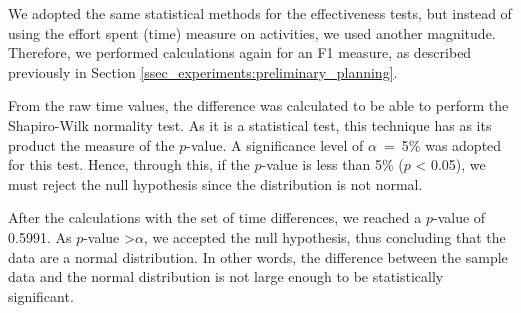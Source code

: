 We adopted the same statistical methods for the effectiveness tests, but instead of using the effort spent (time) measure on activities, we used another magnitude.
Therefore, we performed calculations again for an F1 measure, as described previously in Section \ref{ssec_experiments:preliminary_planning}.


From the raw time values, the difference was calculated to be able to perform the Shapiro-Wilk normality test.
As it is a statistical test, this technique has as its product the measure of the $p$-value.
A significance level of $\alpha$~=~5\% was adopted for this test.
Hence, through this, if the $p$-value is less than 5\% ($p$ < 0.05), we must reject the null hypothesis since the distribution is not normal.

After the calculations with the set of time differences, we reached a $p$-value of 0.5991.
As $p$-value \textgreater $\alpha$, we accepted the null hypothesis, thus concluding that the data are a normal distribution.
In other words, the difference between the sample data and the normal distribution is not large enough to be statistically significant.

